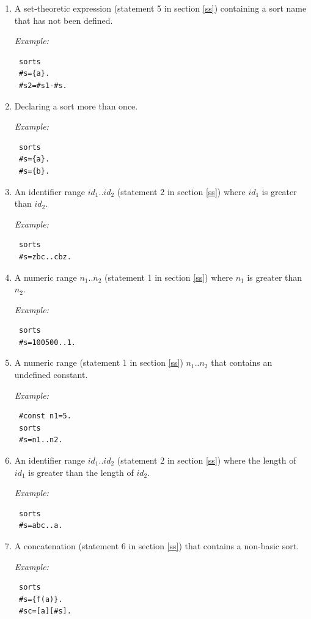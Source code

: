 \documentclass[12pt, letterpaper]{article}
\begin{document}
\begin{enumerate}
\item  A set-theoretic expression (statement 5 in section \ref{ss}) containing a sort name that has not been defined.

\textit{Example:}
\begin{verbatim}
 sorts
 #s={a}.
 #s2=#s1-#s.
\end{verbatim}

\item  Declaring a sort more than once.

\textit{Example:}
\begin{verbatim}
 sorts
 #s={a}.
 #s={b}.
\end{verbatim}

\item An identifier range $id_1..id_2$ (statement 2 in section \ref{ss}) where $id_1$ is greater than $id_2$.

\textit{Example:}
\begin{verbatim}
 sorts
 #s=zbc..cbz.
\end{verbatim}

\item A numeric range $n_1..n_2$ (statement 1 in section \ref{ss}) where  $n_1$ is greater than $n_2$.

\textit{Example:}
\begin{verbatim}
 sorts
 #s=100500..1.
\end{verbatim}


\item A numeric range (statement 1 in section \ref{ss}) $n_1..n_2$ that  contains an undefined constant.

\textit{Example:}
\begin{verbatim}
 #const n1=5.
 sorts
 #s=n1..n2.
\end{verbatim}

\item An identifier range $id_1..id_2$ (statement 2 in section \ref{ss}) where  the length of $id_1$ is greater than the length of $id_2$. 


\textit{Example:}
\begin{verbatim}
 sorts
 #s=abc..a.
\end{verbatim}

\item A concatenation (statement  6 in section \ref{ss}) that contains a non-basic sort.

\textit{Example:}
\begin{verbatim}
 sorts
 #s={f(a)}.
 #sc=[a][#s].
\end{verbatim}




\end{enumerate}
\end{document}
